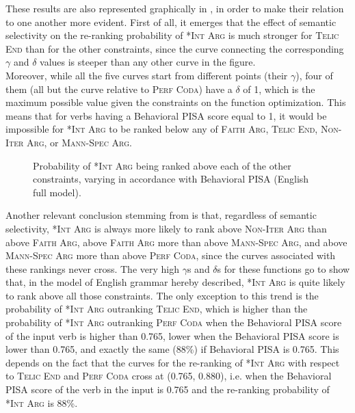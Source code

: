 These results are also represented graphically in , in order to make their relation to one another more evident. First of all, it emerges that the effect of semantic selectivity on the re-ranking probability of \textsc{*Int Arg} is much stronger for \textsc{Telic End} than for the other constraints, since the curve connecting the corresponding $\gamma$ and $\delta$ values is steeper than any other curve in the figure.\\
Moreover, while all the five curves start from different points (their $\gamma$), four of them (all but the curve relative to \textsc{Perf Coda}) have a $\delta$ of 1, which is the maximum possible value given the constraints on the function optimization. This means that for verbs having a Behavioral PISA score equal to 1, it would be impossible for \textsc{*Int Arg} to be ranked below any of \textsc{Faith Arg}, \textsc{Telic End}, \textsc{Non-Iter Arg}, or \textsc{Mann-Spec Arg}.

\begin{figure}[htb]
\caption{Probability of \textsc{*Int Arg} being ranked above each of the other constraints, varying in accordance with Behavioral PISA (English full model).}
    
\end{figure}

Another relevant conclusion stemming from  is that, regardless of semantic selectivity, \textsc{*Int Arg} is always more likely to rank above \textsc{Non-Iter Arg} than above \textsc{Faith Arg}, above \textsc{Faith Arg} more than above \textsc{Mann-Spec Arg}, and above \textsc{Mann-Spec Arg} more than above \textsc{Perf Coda}, since the curves associated with these rankings never cross. The very high $\gamma$s and $\delta$s for these functions go to show that, in the model of English grammar hereby described, \textsc{*Int Arg} is quite likely to rank above all those constraints. The only exception to this trend is the probability of \textsc{*Int Arg} outranking \textsc{Telic End}, which is higher than the probability of \textsc{*Int Arg} outranking \textsc{Perf Coda} when the Behavioral PISA score of the input verb is higher than 0.765, lower when the Behavioral PISA score is lower than 0.765, and exactly the same (88\%) if Behavioral PISA is 0.765. This depends on the fact that the curves for the re-ranking of \textsc{*Int Arg} with respect to \textsc{Telic End} and \textsc{Perf Coda} cross at (0.765, 0.880), i.e. when the Behavioral PISA score of the verb in the input is 0.765 and the re-ranking probability of \textsc{*Int Arg} is 88\%.

